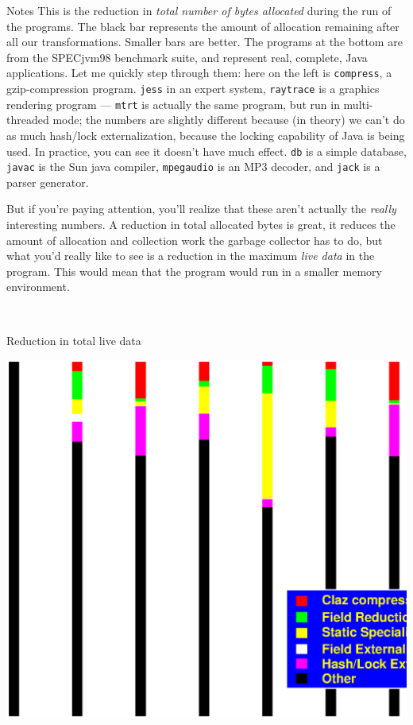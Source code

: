 \documentclass[%
pdf,
colorBG,
slideColor,
nototal,
oqe
]{prosper}
\newenvironment{talknotes}{\begin{slide}{Notes}\tiny}{\end{slide}}
\begin{document}
\begin{talknotes}
This is the reduction in \emph{total number of bytes allocated} during
the run of the programs.  The black bar represents the amount of
allocation remaining after all our transformations.  Smaller bars are better.
The programs at the bottom are from the
SPECjvm98 benchmark suite, and represent real, complete, Java
applications.  Let me quickly step through them: here on the left is
{\tt compress}, a gzip-compression program.  {\tt jess} in an expert
system, {\tt raytrace} is a graphics rendering program --- {\tt mtrt}
is actually the same program, but run in multi-threaded mode; the
numbers are slightly different because (in theory) we can't do as much
hash/lock externalization, because the locking capability of Java is
being used.  In practice, you can see it doesn't have much effect.
{\tt db} is a simple database, {\tt javac} is the Sun java compiler,
{\tt mpegaudio} is an MP3 decoder, and {\tt jack} is a parser
generator.

But if you're paying attention, you'll realize that these aren't
actually the \emph{really} interesting numbers.  A reduction in total
allocated bytes is great, it reduces the amount of allocation and
collection work the
garbage collector has to do, but what you'd really like to see is a
reduction in the maximum \emph{live data} in the program.  This would
mean that the program would run in a smaller memory environment.

~%
\end{talknotes}

\begin{slide}{Reduction in total live data}
\begin{center}
\includegraphics[scale=0.45]{Figures/oopsla-ttllive-color.eps}
\end{center}
\end{slide}
\end{document}
